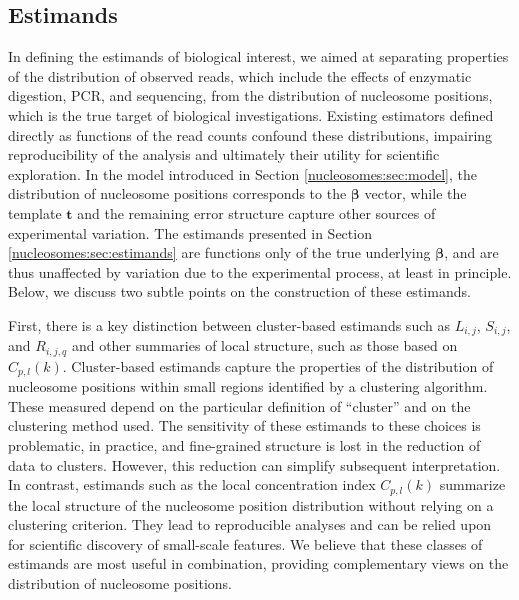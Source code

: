 \subsection{Estimands}
\label{nucleosomes:sec:remarksEstimands}

In defining the estimands of biological interest, we aimed at separating properties of the distribution of observed reads, which include the effects of enzymatic digestion, PCR, and sequencing, from  the distribution of nucleosome positions, which is the true target of biological investigations.
Existing estimators defined directly as functions of the read counts confound these distributions, impairing reproducibility of the analysis and ultimately their utility for scientific exploration.
In the model introduced in Section \ref{nucleosomes:sec:model}, the distribution of nucleosome positions corresponds to the $\bm \beta$ vector, while the template $\bm{t}$ and the remaining error structure capture other sources of experimental variation.
The estimands presented in Section \ref{nucleosomes:sec:estimands} are functions only of the true underlying $\bm \beta$, and are thus unaffected by variation due to the experimental process, at least in principle.
Below, we discuss two subtle points on the construction of these estimands.

First, there is a key distinction between cluster-based estimands such as $L_{i,j}$, $S_{i,j}$, and $R_{i,j,q}$ and other summaries of local structure, such as those based on $C_{p,l}(k)$.
Cluster-based estimands capture the properties of the distribution of nucleosome positions within small regions identified by a clustering algorithm.
These measured depend on the particular definition of ``cluster'' and on the clustering method used.
The sensitivity of these estimands to these choices is problematic, in practice, and fine-grained structure is lost in the reduction of data to clusters.
However, this reduction can simplify subsequent interpretation.
%
In contrast, estimands such as the local concentration index $C_{p,l}(k)$ summarize the local structure of the nucleosome position distribution without relying on a clustering criterion.
They lead to reproducible analyses and can be relied upon for scientific discovery of small-scale features.
%
We believe that these classes of estimands are most useful in combination, providing complementary views on the distribution of nucleosome positions.

